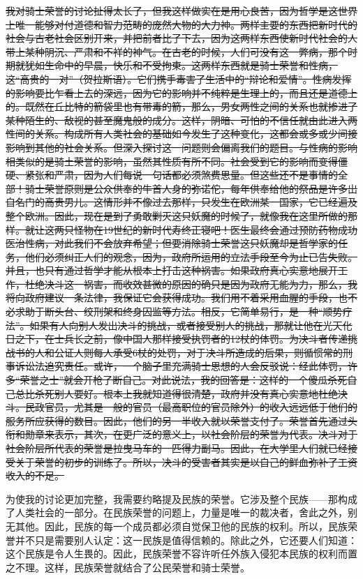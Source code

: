 \documentclass[12pt,oneside]{book}
\begin{document}
\sout{我对骑士荣誉的讨论扯得太长了，但我这样做实在是用心良苦，因为哲学是这世界上唯一能够对付道德和智力范畴的庞然大物的大力神。两样主要的东西把新时代的社会与古老社会区别开来，并把前者比了下去，因为这两样东西使新时代社会的人带上某种阴沉、严肃和不祥的神气。在古老的时候，人们可没有这一弊病，那个时期就犹如生命中的早晨，快乐和不受拘束。这两样东西就是骑士荣誉和性病，这“高贵的一对”（贺拉斯语）。它们携手毒害了生活中的“辩论和爱情”。性病发挥的影响要比乍看上去的深远，因为它的影响并不纯粹是生理上的，而且还是道德上的。既然在丘比特的箭袋里也有带毒的箭，那么，男女两性之间的关系也就掺进了某种陌生的、敌视的甚至魔鬼般的成分。这样，阴暗、可怕的不信任就由此进入两性间的关系。构成所有人类社会的基础如今发生了这种变化，这都会或多或少间接影响到其他的社会关系。但深入探讨这一问题则会偏离我们的题目。与性病的影响相类似的是骑土荣誉的影响，虽然其性质有所不同。社会受到它的影响而变得僵硬、紧张和严肃，因为人们每说一句话都必须煞费思量。但这些还不是事情的全部！骑士荣誉原则是公众供奉的牛首人身的弥诺佗，每年供奉给他的祭品是许多出自名门的高贵男儿。这情形并不像过去那样，只发生在欧洲某一国家，它已经遍及整个欧洲。因此，现在是到了勇敢剿灭这只妖魔的时候了，就像我在这里所做的那样。就让这两只怪物在19世纪的新时代寿终正寝吧！医生最终会通过预防药物成功医治性病，对此我们不会放弃希望；但要消除骑士荣誉这只妖魔却是哲学家的任务，他们必须纠正人们的观念，因为，政府所运用的立法手段至今为止已告失败。并且，也只有通过哲学才能从根本上打击这种祸害。如果政府真心实意地展开工作，杜绝决斗这一祸害，而收效甚微的原因的确只是因为政府无能为力，那么，我将向政府建议一条法律，我保证它会获得成功。我们用不着采用血腥的手段，也不必求助于断头台、绞刑架和终身囚监等方法。相反，它简单易行，是一种“顺势疗法”。如果有人向别人发出决斗的挑战，或者接受别人的挑战，那就让他在光天化日之下，在士兵长之前，像中国人那样接受执罚者的12杖的体罚。为决斗者传递挑战书的人和公证人则每人承受6杖的处罚，对于决斗所造成的后果，则循惯常的刑事诉讼法追究责任。或许，一个脑子里充满骑士思想的人会反驳说：经此体罚，许多“荣誉之士”就会开枪了断自己。对此说法，我的回答是：这样的一个傻瓜杀死自己总比杀死别人要好。根本上我就知道得很清楚，政府并没有真心实意地杜绝决斗。民政官员，尤其是一般的官员（最高职位的官员除外）的收入远远低于他们的服务所应获得的数目。因此，他们的另一半收入就以荣誉支付了。荣誉首先通过头衔和勋章来表示，其次，在更广泛的意义上，以社会阶层的荣誉为代表。决斗对于社会阶层所代表的荣誉是拉曳马车的一匹得力副马。因此，在大学里人们就已经接受关于荣誉的初步的训练了。所以，决斗的受害者其实是以自己的鲜血弥补了工资收入的不足。 }

为使我的讨论更加完整，我需要约略提及民族的荣誉。它涉及整个民族——那构成了人类社会的一部分。在民族荣誉的问题上，力量是唯一的裁决者，舍此之外，别无其他。因此，民族的每一个成员都必须自觉保卫他的民族的权利。所以，民族荣誉并不只是需要别人认定：这一民族是值得信赖的。除此之外，它还要人们知道：这个民族是令人生畏的。因此，民族荣誉不容许听任外族入侵犯本民族的权利而置之不理。这样，民族荣誉就结合了公民荣誉和骑士荣誉。 
\end{document}
